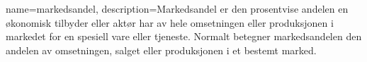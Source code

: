 
{
    name=markedsandel,
    description={Markedsandel er den prosentvise andelen en økonomisk tilbyder eller aktør har av hele omsetningen eller produksjonen i markedet for en spesiell vare eller tjeneste.
     Normalt betegner markedsandelen den andelen av omsetningen, salget eller produksjonen i et bestemt marked. }
} 